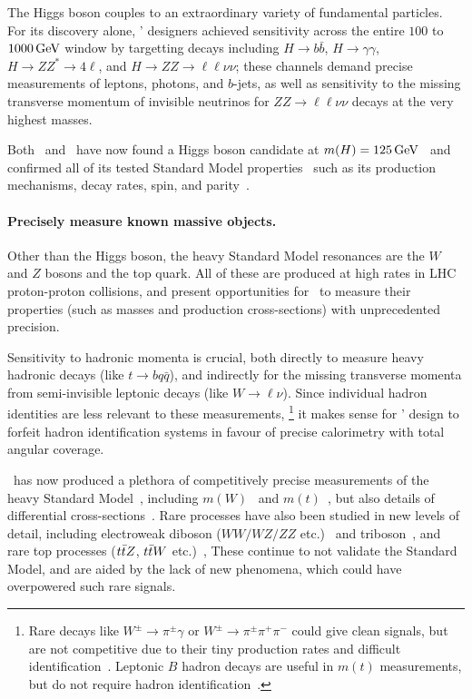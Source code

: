 The Higgs boson couples to an extraordinary variety of fundamental particles.
For its discovery alone, \atlas' designers achieved sensitivity across the
entire $100$ to $1000\,\eV[G]$ window by targetting decays including
$H\to b\bar b$,
$H\to \gamma\gamma$,
$H\to ZZ^* \to 4\ell$, and
$H\to ZZ \to \ell\ell\nu\nu$;
these channels demand precise measurements of leptons, photons, and
$b$-jets, as well as sensitivity to the missing transverse momentum of
invisible neutrinos for $ZZ \to \ell\ell\nu\nu$ decays at the very highest
masses.

Both \atlas\ and \cms\ have now found a Higgs boson candidate at
$m(H) = 125\,\eV[G]$~\cite{
atlas2012higgs,
atlas2012combined,
cms2012higgs
}
and confirmed all of its tested Standard Model properties~\cite{
combined2016higgs,
atlas2022ten,
cms2022ten
}
such as its production mechanisms, decay rates,
spin, and parity~\cite{
HIGG-2013-01,
HIGG-2013-17,
HIGG-2014-06
}.

\paragraph{Precisely measure known massive objects.}
Other than the Higgs boson, the heavy Standard Model resonances are the
$W$ and $Z$ bosons and the top quark.
All of these are produced at high rates in LHC proton-proton collisions,
and present opportunities for \atlas\ to measure their properties
(such as masses and production cross-sections) with unprecedented precision.

Sensitivity to hadronic momenta is crucial,
both directly to measure heavy hadronic decays
(like $t \to bq\bar{q}$),
and indirectly for the missing transverse momenta from semi-invisible
leptonic decays (like $W \to \ell\nu$).
Since individual hadron identities are less relevant to these measurements,%
\footnote{%
Rare decays like
$W^\pm \to \pi^\pm \gamma$ or $W^\pm \to \pi^\pm \pi^+ \pi^-$
could give clean signals, but are not competitive due to their
tiny production rates and difficult identification~\cite{
cdf1996search,
mangano2014wpiy,
cms2021wpiy
}.
Leptonic $B$ hadron decays are useful in $m(t)$ measurements, but do not
require hadron identification~\cite{
CDF:2009mbf,
CMS:2016ixg,
ATLAS:2022jbw
}.%
}
it makes sense for \atlas' design to forfeit hadron identification systems
in favour of precise calorimetry with total angular coverage.

\atlas\ has now produced a plethora of competitively precise measurements
of the heavy Standard Model~\cite{atlas2021summarysm},
including $m(W)$~\cite{atlas2018wmass} and
$m(t)$~\cite{atlas2022symmarytop, atlas2019topmass, TOPQ-2015-03},
but also details of differential cross-sections~\cite{
STDM-2016-11,
STDM-2016-14,
TOPQ-2018-15,
TOPQ-2016-10
}.
Rare processes have also been studied in new levels of detail,
including
electroweak diboson ($WW/WZ/ZZ$ etc.)~\cite{
STDM-2015-21,
STDM-2015-23,
STDM-2017-09
}
and triboson~\cite{
STDM-2016-06,
STDM-2017-22,
STDM-2019-09
},
and rare top processes
($\ttbar Z$, $\ttbar W$ etc.)~\cite{
TOPQ-2013-05,
TOPQ-2018-01,
TOPQ-2020-03
},
These continue to not validate the Standard Model, and are aided by the lack of
new phenomena, which could have overpowered such rare signals.

